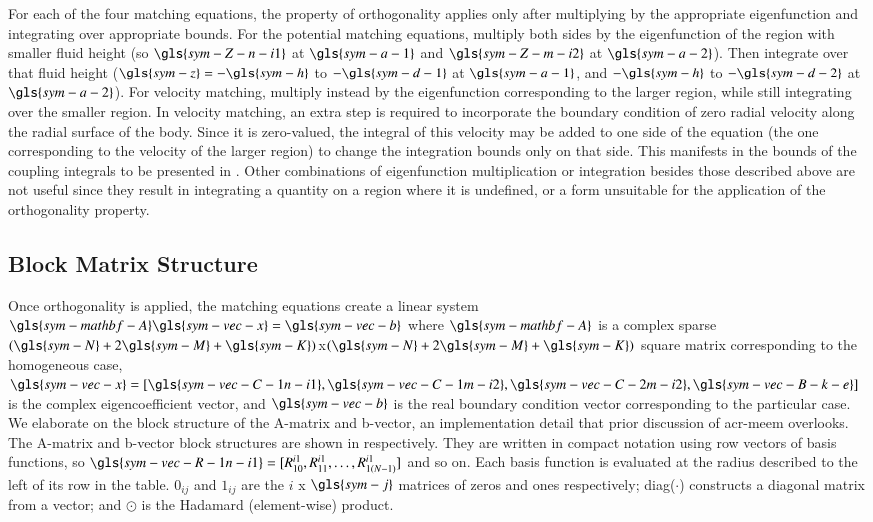 For each of the four matching equations, the property of orthogonality applies only after multiplying by the appropriate eigenfunction and integrating over appropriate bounds.
For the potential matching equations, multiply both sides by the eigenfunction of the region with smaller fluid height (so $\gls{sym-Z-n-i1}$ at $\gls{sym-a-1}$ and $\gls{sym-Z-m-i2}$ at $\gls{sym-a-2}$).
Then integrate over that fluid height ($\gls{sym-z}=-\gls{sym-h}$ to $-\gls{sym-d-1}$ at $\gls{sym-a-1}$, and $-\gls{sym-h}$ to $-\gls{sym-d-2}$ at $\gls{sym-a-2}$).
For velocity matching, multiply instead by the eigenfunction corresponding to the larger region, while still integrating over the smaller region.
In velocity matching, an extra step is required to incorporate the boundary condition of zero radial velocity along the radial surface of the body.
Since it is zero-valued, the integral of this velocity may be added to one side of the equation (the one corresponding to the velocity of the larger region) to change the integration bounds only on that side.
This manifests in the bounds of the coupling integrals to be presented in .
Other combinations of eigenfunction multiplication or integration besides those described above are not useful since they result in integrating a quantity on a region where it is undefined, or a form unsuitable for the application of the orthogonality property.

\subsection{Block Matrix Structure}

Once orthogonality is applied, the matching equations create a linear system $\gls{sym-mathbf-A}\gls{sym-vec-x}=\gls{sym-vec-b}$ where $\gls{sym-mathbf-A}$ is a complex sparse $(\gls{sym-N}+2\gls{sym-M}+\gls{sym-K})$x$(\gls{sym-N}+2\gls{sym-M}+\gls{sym-K})$ square matrix corresponding to the homogeneous case, $\gls{sym-vec-x}=[\gls{sym-vec-C-1n-i1}, \gls{sym-vec-C-1m-i2}, \gls{sym-vec-C-2m-i2}, \gls{sym-vec-B-k-e}]$ is the complex eigencoefficient vector, and $\gls{sym-vec-b}$ is the real boundary condition vector corresponding to the particular case.
We elaborate on the block structure of the A-matrix and b-vector, an implementation detail that prior discussion of \gls{acr-meem} overlooks.
The A-matrix and b-vector block structures are shown in  respectively.
They are written in compact notation using row vectors of basis functions, so $\gls{sym-vec-R-1n-i1}=[R_{10}^{i1}, R_{11}^{i1},\dots, R_{1(N-1)}^{i1}]$ and so on.
Each basis function is evaluated at the radius described to the left of its row in the table. $0_{ij}$ and $1_{ij}$ are the $i$ x $\gls{sym-j}$ matrices of zeros and ones respectively; diag($\cdot$) constructs a diagonal matrix from a vector; and $\odot$ is the Hadamard (element-wise) product.

